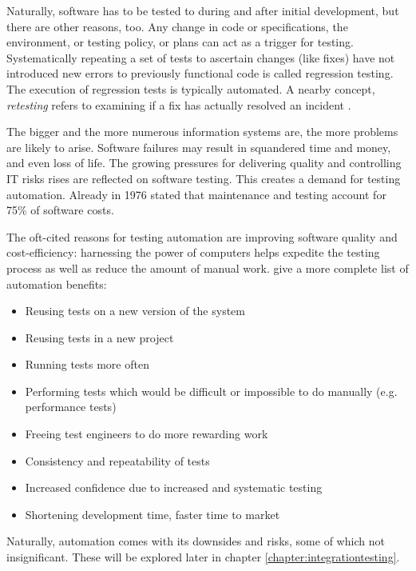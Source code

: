 \documentclass[12pt,a4paper,oneside,pdftex]{report}
\begin{document}

Naturally, software has to be tested to during and after initial development, but there are other reasons, too. Any change in code or specifications, the environment, or testing policy, or plans can act as a trigger for testing. Systematically repeating a set of tests to ascertain changes (like fixes) have not introduced new errors to previously functional code is called regression testing. The execution of regression tests is typically automated. A nearby concept, \textit{retesting} refers to examining if a fix has actually resolved an incident \citep{jenkins2008software}.

The bigger and the more numerous information systems are, the more problems are likely to arise. Software failures may result in squandered time and money, and even loss of life. The growing pressures for delivering quality and controlling IT risks rises are reflected on software testing. This creates a demand for testing automation. Already in 1976 \citet{myers1976software} stated that maintenance and testing account for 75\% of software costs.

The oft-cited reasons for testing automation are improving software quality and cost-efficiency: harnessing the power of computers helps expedite the testing process as well as reduce the amount of manual work. \citet{fewster1999software} give a more complete list of automation benefits: %

\begin{itemize}
\item Reusing tests on a new version of the system
\item Reusing tests in a new project
\item Running tests more often
\item Performing tests which would be difficult or impossible to do manually (e.g. performance tests)
\item Freeing test engineers to do more rewarding work
\item Consistency and repeatability of tests
\item Increased confidence due to increased and systematic testing
\item Shortening development time, faster time to market
\end{itemize}

Naturally, automation comes with its downsides and risks, some of which not insignificant. These will be explored later in chapter \ref{chapter:integrationtesting}.
\end{document}
